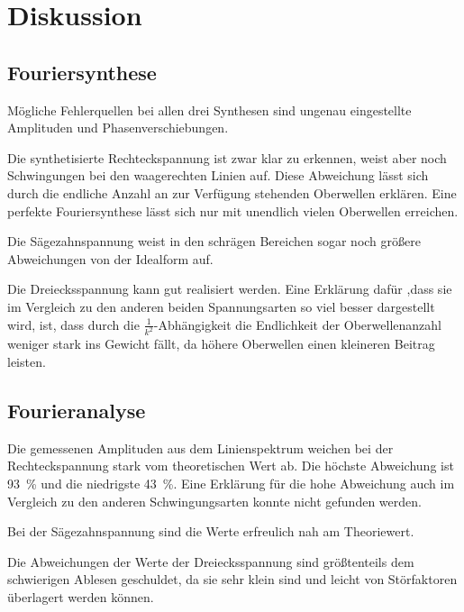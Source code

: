 \section{Diskussion}
\label{sec:Diskussion}

\subsection{Fouriersynthese}

Mögliche Fehlerquellen bei allen drei Synthesen sind ungenau
eingestellte Amplituden und Phasenverschiebungen.

Die synthetisierte Rechteckspannung ist zwar klar zu erkennen,
weist aber noch Schwingungen bei den waagerechten Linien auf.
Diese Abweichung lässt sich durch die endliche Anzahl an zur Verfügung
stehenden Oberwellen erklären.
Eine perfekte Fouriersynthese lässt sich nur mit unendlich vielen
Oberwellen erreichen.

Die Sägezahnspannung weist in den schrägen Bereichen sogar noch größere Abweichungen
von der Idealform auf.

Die Dreiecksspannung kann gut realisiert werden. Eine Erklärung dafür
,dass sie im Vergleich zu den anderen beiden Spannungsarten so viel
besser dargestellt wird, ist, dass durch die $\frac{1}{k^2}$-Abhängigkeit
die Endlichkeit der Oberwellenanzahl weniger stark ins Gewicht fällt, da
höhere Oberwellen einen kleineren Beitrag leisten.

\subsection{Fourieranalyse}

Die gemessenen Amplituden aus dem Linienspektrum weichen bei der
Rechteckspannung stark vom theoretischen Wert ab. Die höchste
Abweichung ist \SI{93}{\percent} und die niedrigste \SI{43}{\percent}.
Eine Erklärung für die hohe Abweichung auch im Vergleich zu den
anderen Schwingungsarten konnte nicht gefunden werden.

Bei der Sägezahnspannung sind die Werte erfreulich nah am Theoriewert.

Die Abweichungen der Werte der Dreiecksspannung sind größtenteils
dem schwierigen Ablesen geschuldet, da sie sehr klein sind und leicht
von Störfaktoren überlagert werden können.
